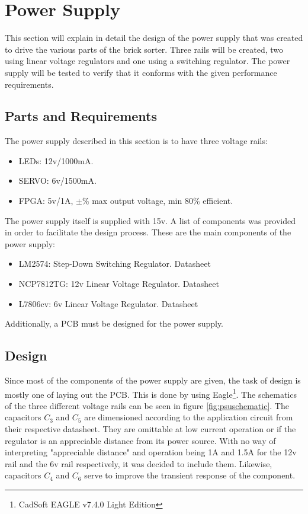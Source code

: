 \section{Power Supply}
This section will explain in detail the design of the power supply that was created to drive the various parts of the brick sorter. Three rails will be created, two using linear voltage regulators and one using a switching regulator. The power supply will be tested to verify that it conforms with the given performance requirements.
\subsection{Parts and Requirements}
The power supply described in this section is to have three voltage rails:
\begin{itemize}
	\item LEDs: 12v/1000mA.
	\item SERVO: 6v/1500mA.
	\item FPGA: 5v/1A, $\pm$\% max output voltage, min 80\% efficient.
\end{itemize}
The power supply itself is supplied with 15v. A list of components was provided in order to facilitate the design process. These are the main components of the power supply:
\begin{itemize}
	\item LM2574: Step-Down Switching Regulator. Datasheet \cite{lm2574}
	\item NCP7812TG: 12v Linear Voltage Regulator. Datasheet \cite{ncp7812tg}
	\item L7806cv: 6v Linear Voltage Regulator. Datasheet \cite{l7806}
\end{itemize}
Additionally, a PCB must be designed for the power supply.
\subsection{Design}
Since most of the components of the power supply are given, the task of design is mostly one of laying out the PCB. This is done by using Eagle\footnote{CadSoft EAGLE v7.4.0 Light Edition}. The schematics of the three different voltage rails can be seen in figure \ref{fig:psuschematic}.
The capacitors $C_3$ and $C_5$ are dimensioned according to the application circuit from their respective datasheet. They are omittable at low current operation or if the regulator is an appreciable distance from its power source. With no way of interpreting "appreciable distance" and operation being 1A and 1.5A for the 12v rail and the 6v rail respectively, it was decided to include them. Likewise, capacitors $C_4$ and $C_6$ serve to improve the transient response of the component.

